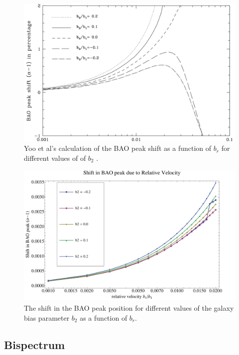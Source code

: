 \documentclass[12pt]{article}
\begin{document}
\begin{figure}[h]
	\centering
	\includegraphics[width=14cm]{yds_bplots}
	\caption{Yoo et al's calculation of the BAO peak shift as a function of $b_{r}$ for different values of of $b_{2}$ \cite{Yooetal}.}
	\label{yds_bplots}
\end{figure}

\begin{figure}[h]
	\centering
	\includegraphics[width=14cm]{bplots}
	\caption{The shift in the BAO peak position for different values of the galaxy bias parameter $b_{2}$ as a function of $b_{r}$.}
	\label{bplots}
\end{figure}

\subsection{Bispectrum}
\end{document}
